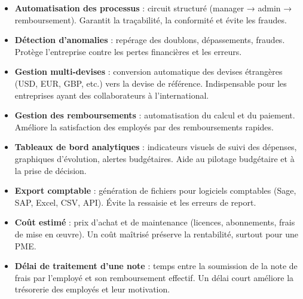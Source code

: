 \documentclass[12pt,a4paper]{report}
\begin{document}
\begin{itemize}
 \item \textbf{Automatisation des processus} : circuit structuré (manager → admin → remboursement). Garantit la traçabilité, la conformité et évite les fraudes.

 

 \item \textbf{Détection d’anomalies} : repérage des doublons, dépassements, fraudes. Protège l’entreprise contre les pertes financières et les erreurs.

 

 \item \textbf{Gestion multi‑devises} : conversion automatique des devises étrangères (USD, EUR, GBP, etc.) vers la devise de référence. Indispensable pour les entreprises ayant des collaborateurs à l’international.

 

 \item \textbf{Gestion des remboursements} : automatisation du calcul et du paiement. Améliore la satisfaction des employés par des remboursements rapides.

 

 \item \textbf{Tableaux de bord analytiques} : indicateurs visuels de suivi des dépenses, graphiques d’évolution, alertes budgétaires. Aide au pilotage budgétaire et à la prise de décision.

 

 \item \textbf{Export comptable} : génération de fichiers pour logiciels comptables (Sage, SAP, Excel, CSV, API). Évite la ressaisie et les erreurs de report.

 

 \item \textbf{Coût estimé} : prix d’achat et de maintenance (licences, abonnements, frais de mise en œuvre). Un coût maîtrisé préserve la rentabilité, surtout pour une PME.

 

 \item \textbf{Délai de traitement d’une note} : temps entre la soumission de la note de frais par l’employé et son remboursement effectif. Un délai court améliore la trésorerie des employés et leur motivation.

\end{itemize}
\end{document}
